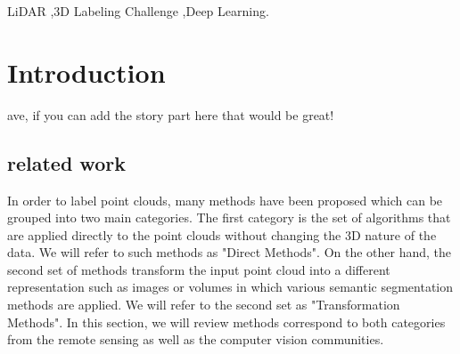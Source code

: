 \documentclass[final,3p,times,twocolumn,authoryear]{elsarticle}
\newcommand{\mxy}[1]{ \color{red}{#1}}
\begin{document}
\begin{frontmatter}
\begin{abstract}
\end{abstract}

\begin{keyword}
LiDAR \sep 3D Labeling Challenge \sep Deep Learning.


\end{keyword}

\end{frontmatter}


\section{Introduction}
\label{}{\mxy Dave, if you can add the story part here that would be great!}

\subsection{related work}
In order to label point clouds, many methods have been proposed which can be grouped into two main categories. The first category is the set of algorithms that are applied directly to the point clouds without changing the 3D nature of the data. We will refer to such methods as "Direct Methods". On the other hand, the second set of methods transform the input point cloud into a different representation such as images or volumes in which various semantic segmentation methods are applied. We will refer to the second set as "Transformation Methods". In this section, we will review methods correspond to both categories from the remote sensing as well as the computer vision communities. 
\end{document}
